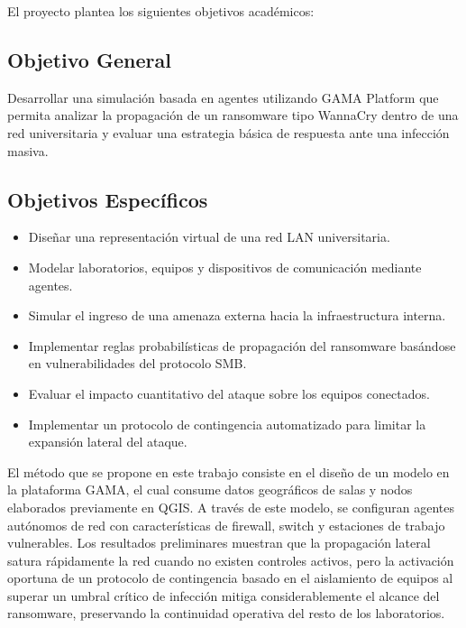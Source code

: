 El proyecto plantea los siguientes objetivos académicos:

\subsection{Objetivo General}
Desarrollar una simulación basada en agentes utilizando GAMA Platform que permita analizar la propagación de un ransomware tipo WannaCry dentro de una red universitaria y evaluar una estrategia básica de respuesta ante una infección masiva.

\subsection{Objetivos Específicos}
\begin{itemize}
    \item Diseñar una representación virtual de una red LAN universitaria.
    \item Modelar laboratorios, equipos y dispositivos de comunicación mediante agentes.
    \item Simular el ingreso de una amenaza externa hacia la infraestructura interna.
    \item Implementar reglas probabilísticas de propagación del ransomware basándose en vulnerabilidades del protocolo SMB.
    \item Evaluar el impacto cuantitativo del ataque sobre los equipos conectados.
    \item Implementar un protocolo de contingencia automatizado para limitar la expansión lateral del ataque.
\end{itemize}

El método que se propone en este trabajo consiste en el diseño de un modelo en la plataforma GAMA, el cual consume datos geográficos de salas y nodos elaborados previamente en QGIS. A través de este modelo, se configuran agentes autónomos de red con características de firewall, switch y estaciones de trabajo vulnerables. Los resultados preliminares muestran que la propagación lateral satura rápidamente la red cuando no existen controles activos, pero la activación oportuna de un protocolo de contingencia basado en el aislamiento de equipos al superar un umbral crítico de infección mitiga considerablemente el alcance del ransomware, preservando la continuidad operativa del resto de los laboratorios.